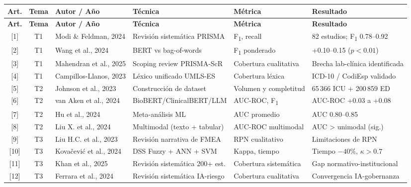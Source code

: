 \documentclass[11pt,a4paper]{article}
\begin{document}
\begin{small}
\begin{longtable}{c c p{3.4cm} p{2.6cm} p{2.6cm} p{3.4cm}}
\toprule
\textbf{Art.} & \textbf{Tema} & \textbf{Autor / Año} & \textbf{Técnica} & \textbf{Métrica} & \textbf{Resultado} \\
\midrule
\endfirsthead
\toprule
\textbf{Art.} & \textbf{Tema} & \textbf{Autor / Año} & \textbf{Técnica} & \textbf{Métrica} & \textbf{Resultado} \\
\midrule
\endhead

{[1]}  & T1 & Modi \& Feldman, 2024     & Revisión sistemática PRISMA       & F\textsubscript{1}, recall          & 82 estudios; F\textsubscript{1} 0.78--0.92 \\
{[2]}  & T1 & Wang et al., 2024         & BERT vs bag-of-words              & F\textsubscript{1} ponderado        & +0.10--0.15 ($p<0.01$) \\
{[3]}  & T1 & Mahendran et al., 2025    & Scoping review PRISMA-ScR         & Cobertura cualitativa               & Brecha lab-clínica identificada \\
{[4]}  & T1 & Campillos-Llanos, 2023    & Léxico unificado UMLS-ES          & Cobertura léxica                    & ICD-10 / CodiEsp validado \\
{[5]}  & T2 & Johnson et al., 2023      & Construcción de dataset           & Volumen y completitud               & 65\,366 ICU + 200\,859 ED \\
{[6]}  & T2 & van Aken et al., 2024     & BioBERT/ClinicalBERT/LLM          & AUC-ROC, F\textsubscript{1}         & AUC-ROC +0.03 a +0.08 \\
{[7]}  & T2 & Hu et al., 2024           & Meta-análisis ML                  & AUC promedio                        & AUC 0.80--0.85 \\
{[8]}  & T2 & Liu X. et al., 2024       & Multimodal (texto + tabular)      & AUC-ROC multimodal                  & AUC > unimodal (sig.) \\
{[9]}  & T3 & Liu H.C. et al., 2023     & Revisión narrativa de FMEA        & RPN cualitativo                     & Limitaciones de RPN \\
{[10]} & T3 & Kovačević et al., 2024    & DSS Fuzzy + ANN + SVM             & Kappa, tiempo                       & Tiempo $-40\%$, $\kappa > 0.7$ \\
{[11]} & T3 & Khan et al., 2025         & Revisión sistemática 200+ est.    & Cobertura sistemática               & Gap normativo-institucional \\
{[12]} & T3 & Ferrara et al., 2024      & Revisión sistemática IA-riesgo    & Cobertura cualitativa               & Convergencia IA-gobernanza \\

\bottomrule
\end{longtable}
\end{small}
\end{document}
